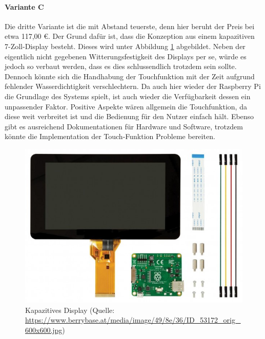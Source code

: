 \paragraph{Variante C}
Die dritte Variante ist die mit Abstand teuerste, denn hier beruht der Preis bei etwa 117,00 €. Der Grund dafür ist, dass die Konzeption aus einem kapazitiven 7-Zoll-Display besteht. Dieses wird unter Abbildung \ref{fig:kapazitives_display} abgebildet. Neben der eigentlich nicht gegebenen Witterungsfestigkeit des Displays per se, würde es jedoch so verbaut werden, dass es dies schlussendlich trotzdem sein sollte. Dennoch könnte sich die Handhabung der Touchfunktion mit der Zeit aufgrund fehlender Wasserdichtigkeit verschlechtern. Da auch hier wieder der Raspberry Pi die Grundlage des Systems spielt, ist auch wieder die Verfügbarkeit dessen ein unpassender Faktor. Positive Aspekte wären allgemein die Touchfunktion, da diese weit verbreitet ist und die Bedienung für den Nutzer einfach hält. Ebenso gibt es ausreichend Dokumentationen für Hardware und Software, trotzdem könnte die Implementation der Touch-Funktion Probleme bereiten.
\begin{figure}[ht]
	\centering
	\includegraphics[width=0.6\linewidth]{Bilder/kapazitives_display.jpg}
	\caption{Kapazitives Display (Quelle: \url{https://www.berrybase.at/media/image/49/8e/36/ID_53172_orig_600x600.jpg})}
	\label{fig:kapazitives_display}
\end{figure}
\newpage
